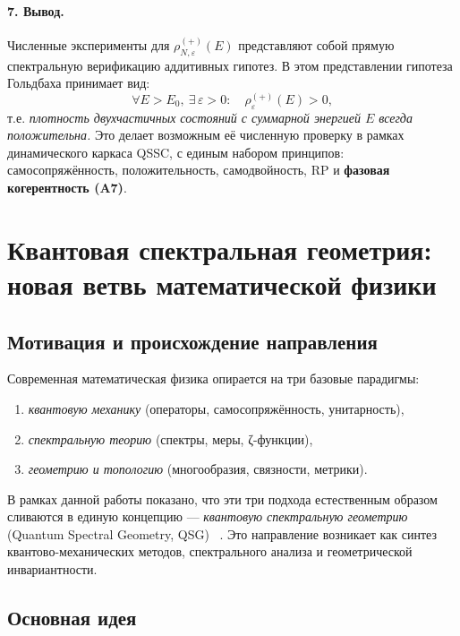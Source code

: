 \documentclass{article}
\numberwithin{equation}{section}
\theoremstyle{plain}
\theoremstyle{definition}
\theoremstyle{remark}
\def\rho{ρ}\def\sigma{σ}\def\Sigma{Σ}\def\tau{τ}%
\begin{document}
\paragraph{7. Вывод.}
Численные эксперименты для \(\rho^{(+)}_{N,\varepsilon}(E)\) представляют собой прямую
спектральную верификацию аддитивных гипотез.
В этом представлении гипотеза Гольдбаха принимает вид:
\begin{equation}
\forall E> E_0,\ \exists\,\varepsilon>0:\quad
\rho^{(+)}_\varepsilon(E)>0,
\end{equation}
т.е. \emph{плотность двухчастичных состояний с суммарной энергией \(E\) всегда положительна.}
Это делает возможным её численную проверку в рамках динамического каркаса QSSC,
с единым набором принципов: самосопряжённость, положительность, самодвойность, RP и \textbf{фазовая когерентность (A7)}.


\clearpage

\section{Квантовая спектральная геометрия: новая ветвь математической физики}

\subsection*{Мотивация и происхождение направления}

Современная математическая физика опирается на три базовые парадигмы:
\begin{enumerate}
\item \emph{квантовую механику} (операторы, самосопряжённость, унитарность),
\item \emph{спектральную теорию} (спектры, меры, ζ-функции),
\item \emph{геометрию и топологию} (многообразия, связности, метрики).
\end{enumerate}

В рамках данной работы показано, что эти три подхода естественным образом
сливаются в единую концепцию — \emph{квантовую спектральную геометрию} (Quantum Spectral Geometry, QSG) ~\cite{Monakhov-QSG-000}.  
Это направление возникает как синтез квантово-механических методов, спектрального анализа и геометрической инвариантности.

\subsection*{Основная идея}
\end{document}

